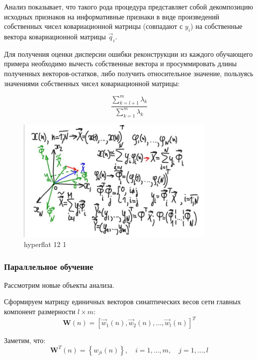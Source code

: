 \documentclass{article}
\numberwithin{equation}{subsection}
\begin{document}
Анализ показывает, что такого рода процедура представляет собой декомпозицию исходных
признаков на информативные признаки в виде произведений собственных чисел ковариационной матрицы
(совпадают с $y_i$) на собственные вектора ковариационной матрицы $\vec{q}_i$.

Для получения оценки дисперсии ошибки реконструкции из каждого обучающего примера необходимо 
вычесть собственные вектора и просуммировать длины полученных векторов-остатков, либо
получить относительное значение, пользуясь значениями собственных чисел ковариационной матрицы:

\begin{equation}
    \dfrac{\sum_{k=l+1}^m \lambda_k}{\sum_{k=1}^m \lambda_k}
\end{equation}

\begin{figure}[htbp]
    \centering
    \includegraphics[height=6cm]{hyperflat_12_1.jpeg}
    \caption{hyperflat 12 1}
    \label{hyperflat_12_1}
\end{figure}




\subsubsection{Параллельное обучение}

Рассмотрим новые объекты анализа.

Сформируем матрицу единичных векторов синаптических весов сети главных компонент
размерности $l \times m$:
\begin{equation}
    \mathbf{W}(n) = 
    \left[
        \vec{w}_1(n), \vec{w}_2(n) , \dots, \vec{w}_l(n)
    \right]^T
\end{equation}

Заметим, что:
\begin{equation*}
    \mathbf{W}^T(n) = 
    \left\{
        w_{ji}(n)
    \right\}, \quad i = 1, \dots, m,\quad j=1, \dots, l
\end{equation*}
\end{document}
